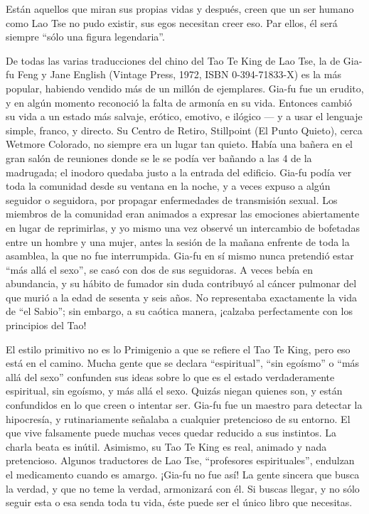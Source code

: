 \documentclass[book,b5paper,hidelinks,final]{memoir}
\begin{document}
	Están aquellos que miran sus propias vidas y después, creen que un ser
	humano como Lao Tse no pudo existir, sus egos necesitan creer eso. Par
	ellos, él será siempre ``sólo una figura legendaria''.
	
	De todas las varias traducciones del chino del Tao Te King de Lao Tse,
	la de Gia-fu Feng y Jane English (Vintage Press, 1972, ISBN
	0-394-71833-X) es la más popular, habiendo vendido más de un millón de
	ejemplares. Gia-fu fue un erudito, y en algún momento reconoció la falta
	de armonía en su vida. Entonces cambió su vida a un estado más salvaje,
	erótico, emotivo, e ilógico --- y a usar el lenguaje simple, franco, y
	directo. Su Centro de Retiro, Stillpoint (El Punto Quieto), cerca
	Wetmore Colorado, no siempre era un lugar tan quieto. Había una bañera
	en el gran salón de reuniones donde se le se podía ver bañando a las 4
	de la madrugada; el inodoro quedaba justo a la entrada del edificio.
	Gia-fu podía ver toda la comunidad desde su ventana en la noche, y a
	veces expuso a algún seguidor o seguidora, por propagar enfermedades de
	transmisión sexual. Los miembros de la comunidad eran animados a
	expresar las emociones abiertamente en lugar de reprimirlas, y yo mismo
	una vez observé un intercambio de bofetadas entre un hombre y una mujer,
	antes la sesión de la mañana enfrente de toda la asamblea, la que no fue
	interrumpida. Gia-fu en sí mismo nunca pretendió estar ``más allá el
	sexo'', se casó con dos de sus seguidoras. A veces bebía en abundancia,
	y su hábito de fumador sin duda contribuyó al cáncer pulmonar del que
	murió a la edad de sesenta y seis años. No representaba exactamente la
	vida de ``el Sabio''; sin embargo, a su caótica manera, ¡calzaba
	perfectamente con los principios del Tao!
	
	El estilo primitivo no es lo Primigenio a que se refiere el Tao Te King,
	pero eso está en el camino. Mucha gente que se declara ``espiritual'',
	``sin egoísmo'' o ``más allá del sexo'' confunden sus ideas sobre lo que
	es el estado verdaderamente espiritual, sin egoísmo, y más allá el sexo.
	Quizás niegan quienes son, y están confundidos en lo que creen o
	intentar ser. Gia-fu fue un maestro para detectar la hipocresía, y
	rutinariamente señalaba a cualquier pretencioso de su entorno. El que
	vive falsamente puede muchas veces quedar reducido a sus instintos. La
	charla beata es inútil. Asimismo, su Tao Te King es real, animado y nada
	pretencioso. Algunos traductores de Lao Tse, ``profesores
	espirituales'', endulzan el medicamento cuando es amargo. ¡Gia-fu no fue
	así! La gente sincera que busca la verdad, y que no teme la verdad,
	armonizará con él. Si buscas llegar, y no sólo seguir esta o esa senda
	toda tu vida, éste puede ser el único libro que necesitas.
	
\end{document}
